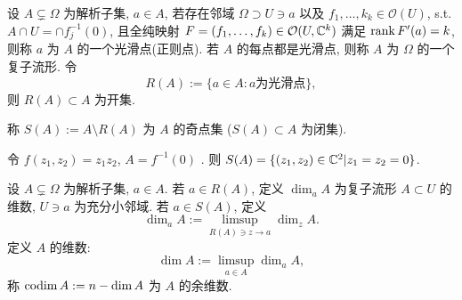 \begin{definition}
  设 $A \subsetneq \Omega $  为解析子集, $a \in A$, 若存在邻域 $ \Omega \supset U \ni a $  以及 $f_1,\dots,k_k \in \mathcal{O}(U)$, s.t. $A \cap U=\cap f_{j}^{-1}(0)$, 且全纯映射 $F=(f_1,\dots,f_k) \in \mathcal{O}(U,{\mathbb C}^k)$ 满足 $\operatorname{rank} F'(a)=k$, 则称 $a$ 为 $A$ 的一个{\sffamily\small 光滑点(正则点)}.    
  若 $A$ 的每点都是光滑点, 则称 $A$ 为 $\Omega $ 的一个{\sffamily\small 复子流形}.  
  令
  $$ R(A):=\{a \in A: a \text{为光滑点}\} ,$$   
  则 $R(A) \subset A$ 为开集. 
\end{definition}
\begin{definition}
  称 $S(A):=A \setminus R(A)$ 为 $A$  的{\sffamily\small 奇点集} ($S(A) \subset A$ 为闭集). 
\end{definition}

\begin{example}
  令 $f(z_1,z_2)=z_1 z_2$, $A=f^{-1}(0)$ .
  则  $S(A)=\{(z_1,z_2)\in {\mathbb C}^2| z_1=z_2=0\}$.  
\end{example}

\begin{definition}[维数]
  设 $A \subsetneq \Omega $ 为解析子集, $a \in A$. 若 $a \in R(A)$, 定义 $\dim_aA$ 为复子流形 $A \subset U$ 的维数, $U \ni a$ 为充分小邻域. 若 $a \in S(A)$, 定义 
  $$ \dim_aA:= \limsup_{R(A) \ni z \to a} \dim_zA .$$   
  定义 $A$ 的维数: 
  $$ \dim A:= \limsup _{a \in A} \dim_aA ,$$  
  称 $\operatorname{codim} A:=n-\dim A$ 为 $A$ 的余维数.     
\end{definition}

